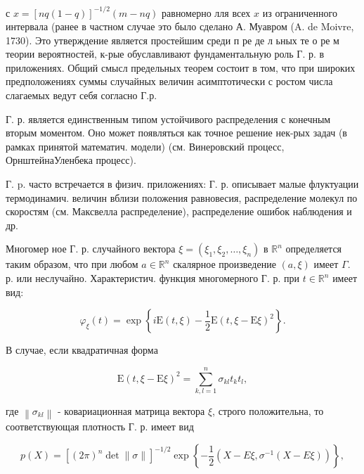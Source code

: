 \documentclass[10pt]{article}
\begin{document}
с $x=[n q(1-q)]^{-1 / 2}(m-n q)$ равномерно лля всех $x$ из ограниченного интервала (ранее в частном случае это было сделано А. Муавром (A. de Moivre, 1730). Это утверждение является простейшим среди п ре де л ьных те о ре м теории вероятностей, к-рые обуславливают фундаментальную роль Г. р. в приложениях. Общий смысл предельных теорем состоит в том, что при широких предположениях суммы случайных величин асимптотически с ростом числа слагаемых ведут себя согласно Г.р.



Г. р. является единственным типом устойчивого распределения с конечным вторым моментом. Оно может появляться как точное решение нек-рых задач (в рамках принятой математич. модели) (см. Винеровский процесс, ОрнштейнаУленбека процесс).



Г. p. часто встречается в физич. приложениях: Г. р. описывает малые флуктуации термодинамич. величин вблизи положения равновесия, распределение молекул по скоростям (см. Максвелла распределение), распределение ошибок наблюдения и др.



Многомер ное Г. р. случайного вектора $\xi=\left(\xi_{1}, \xi_{2}, \ldots, \xi_{n}\right)$ в $\mathbb{R}^{n}$ определяется таким образом, что при любом $a \in \mathbb{R}^{n}$ скалярное произведение $(a, \xi)$ имеет $\Gamma$. р. или неслучайно. Характеристич. функция многомерного Г. р. при $t \in \mathbb{R}^{n}$ имеет вид:



\[

\varphi_{\xi}(t)=\exp \left\{i \mathrm{E}(t, \xi)-\frac{1}{2} \mathrm{E}(t, \xi-\mathrm{E} \xi)^{2}\right\} .

\]



В случае, если квадратичная форма



\[

\mathrm{E}(t, \xi-\mathrm{E} \xi)^{2}=\sum_{k, l=1}^{n} \sigma_{k l} t_{k} t_{l},

\]



где $\left\|\sigma_{k l}\right\|$ - ковариационная матрица вектора $\xi$, строго положительна, то соответствующая плотность Г. р. имеет вид



\[

p(X)=\left[(2 \pi)^{n} \operatorname{det}\|\sigma\|\right]^{-1 / 2} \exp \left\{-\frac{1}{2}\left(X-E \xi, \sigma^{-1}(X-E \xi)\right)\right\},

\]
\end{document}
